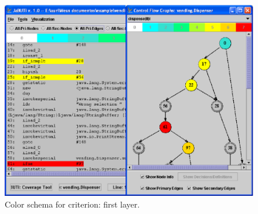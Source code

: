 \begin{figure}[!ht]
\begin{center}
\includegraphics[height=0.40\textheight]{fig/decision-layer1}
\caption{\label{fig:decision-color} Color schema for
 criterion: first layer.}
\end{center}
\end{figure}
